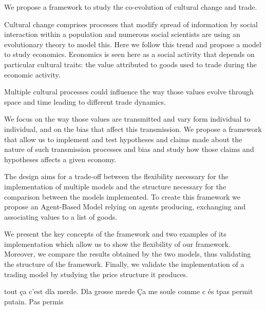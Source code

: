 We propose a framework to study the co-evolution of cultural change and trade. 

Cultural change comprises  processes that modify spread of information by social interaction within a population and numerous social scientists are using an evolutionary theory to model this.
Here we follow this trend and propose a model to study economics. Economics is seen here as a social activity that depends on particular cultural traits: the value attributed to goods used to trade during the economic activity. 

Multiple cultural processes could influence the way those values evolve through space and time leading to different trade dynamics.

We focus on the way those values are transmitted and vary form individual to individual, and on the bias that affect this transmission. We propose a framework that allow us to implement and test hypotheses and claims made about the nature of such transmission processes and bias and study how those claims and hypotheses affects a given economy.

The design aims for a trade-off between the flexibility necessary for the implementation of multiple models and the structure necessary for the comparison between the models implemented. To create this framework we propose an Agent-Based Model relying on agents producing, exchanging and associating values to a list of goods. 

We present the key concepts of the framework and two examples of its implementation which allow us to show the flexibility of our framework. Moreover, we compare the results obtained by the two models, thus validating the structure of the framework. Finally, we validate the implementation of a trading model by studying the price structure it produces.


tout ça c'est dla merde.
Dla grosse merde
Ça me soule comme c és tpas permit putain. Pas permis
